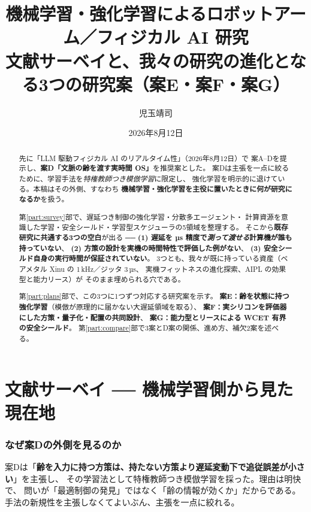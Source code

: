 \documentclass[11pt,a4paper]{article}
\title{\vspace{-12mm}
  \Large 機械学習・強化学習によるロボットアーム／フィジカル AI 研究\\[2mm]
  \large 文献サーベイと、我々の研究の進化となる3つの研究案（案E・案F・案G）\\[1mm]}
\author{\normalsize 児玉靖司}
\date{\normalsize 2026年8月12日}
\newcommand{\prob}[1]{\textbf{\textcolor{red!55!black}{#1}}}
\newcommand{\keyp}[1]{\textbf{\textcolor{blue!45!black}{#1}}}
\begin{document}
\maketitle
\vspace{-6mm}

\begin{abstract}
\noindent
先に「LLM 駆動フィジカル AI のリアルタイム性」（2026年8月12日）で
案A--Dを提示し、\keyp{案D「文脈の齢を渡す実時間 OS」}を推奨案とした。
案Dは主張を一点に絞るために、学習手法を\emph{特権教師つき模倣学習}に限定し、
強化学習を明示的に退けている。本稿はその外側、すなわち
\keyp{機械学習・強化学習を主役に置いたときに何が研究になるか}を扱う。

第\ref{part:survey}部で、遅延つき制御の強化学習・分散多エージェント・
計算資源を意識した学習・安全シールド・学習型スケジューラの5領域を整理する。
そこから\prob{既存研究に共通する3つの空白}が出る ──
\prob{(1) 遅延を µs 精度で\emph{測って渡せる}計算機が誰も持っていない}、
\prob{(2) 方策の設計を実機の時間特性で評価した例がない}、
\prob{(3) 安全シールド自身の実行時間が保証されていない}。
3つとも、我々が既に持っている資産（ベアメタル Xinu の 1\,kHz／ジッタ 3\,µs、
実機フィットネスの進化探索、AIPL の効果型と能力リース）が
そのまま埋められる穴である。

第\ref{part:plans}部で、この3つに1つずつ対応する研究案を示す。
\keyp{案E：齢を状態に持つ強化学習}（模倣が原理的に届かない大遅延領域を取る）、
\keyp{案F：実シリコンを評価器にした方策・量子化・配置の共同設計}、
\keyp{案G：能力型とリースによる WCET 有界の安全シールド}。
第\ref{part:compare}部で3案とD案の関係、進め方、補欠2案を述べる。
\end{abstract}

\vspace{-2mm}
{\small\tableofcontents}
\clearpage

\part{文献サーベイ ── 機械学習側から見た現在地}
\label{part:survey}

\section{なぜ案Dの外側を見るのか}

案Dは「\keyp{齢を入力に持つ方策は、持たない方策より遅延変動下で追従誤差が小さい}」を主張し、
その学習法として特権教師つき模倣学習を採った。理由は明快で、
問いが「最適制御の発見」ではなく「齢の情報が効くか」だからである。
手法の新規性を主張しなくてよいぶん、主張を一点に絞れる。
\end{document}
